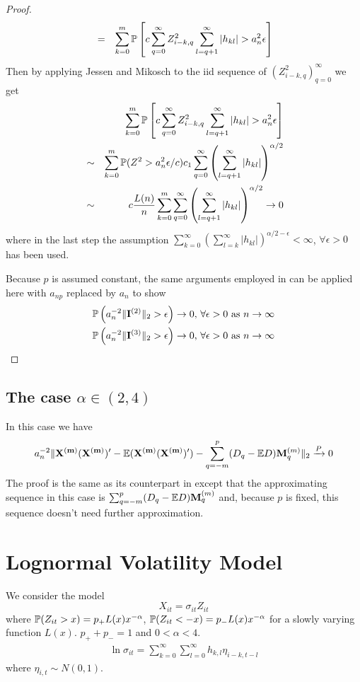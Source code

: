 \documentclass{article}
\begin{document}
\begin{proof}
\begin{eqnarray*}
    &=& \sum_{k=0}^m \mathbb{P}\left[c \sum_{q=0}^{\infty} Z_{i-k, q}^2
      \sum_{l=q+1}^\infty |h_{kl}| > a_n^2 \epsilon \right] \\
  \end{eqnarray*}
  Then by applying Jessen and Mikosch \cite{JessenMikosch2006} to the
  iid sequence of $(Z_{i-k, q}^2)_{q=0}^{\infty}$ we get
  \begin{eqnarray*}
    && \sum_{k=0}^m \mathbb{P}\left[c \sum_{q=0}^{\infty} Z_{i-k, q}^2
      \sum_{l=q+1}^\infty |h_{kl}| > a_n^2 \epsilon \right] \\
    &\sim& \sum_{k=0}^m \mathbb{P}(Z^2 > a_n^2 \epsilon/c) c_1
    \sum_{q=0}^{\infty} \left( \sum_{l=q+1}^\infty |h_{kl}|
    \right)^{\alpha/2} \\
    &\sim& c {L(n) \over n} \sum_{k=0}^m \sum_{q=0}^{\infty} \left(
      \sum_{l=q+1}^\infty |h_{kl}| \right)^{\alpha/2} \to 0
  \end{eqnarray*}
  where in the last step the assumption $\sum_{k=0}^{\infty}
  \left(\sum_{l=k}^{\infty} |h_{kl}|\right)^{\alpha/2-\epsilon} <
  \infty$, $\forall \epsilon > 0$ has been used.

  Because $p$ is assumed constant, the same arguments employed in
  \cite{Mikosch2014} can be applied here with $a_{np}$ replaced by
  $a_n$ to show
  \begin{eqnarray*}
    & \mathbb{P}\left(
      a_n^{-2} \|\mathbf{I}^{(2)}\|_2 > \epsilon
    \right) \to 0 \text{, } \forall \epsilon > 0 \text{ as } n \to
    \infty \\
    & \mathbb{P}\left(
      a_n^{-2} \|\mathbf{I}^{(3)}\|_2 > \epsilon
    \right) \to 0 \text{, } \forall \epsilon > 0 \text{ as } n \to \infty
  \end{eqnarray*}
\end{proof}

\subsection[alpha in (2,4)]{The case $\alpha \in (2,4)$}
In this case we have
\[
a_n^{-2} \|\mathbf{X^{(m)} (X^{(m)})'} - \mathbb{E}(\mathbf{X^{(m)} (X^{(m)})'}) -
\sum_{q=-m}^p (D_q - \mathbb{E} D) \mathbf{M}_q^{(m)}\|_2
\xrightarrow{P} 0
\]
The proof is the same as its counterpart in \cite{Mikosch2014} except
that the approximating sequence in this case is $\sum_{q=-m}^p (D_q -
\mathbb{E} D) \mathbf{M}_q^{(m)}$ and, because $p$ is fixed, this sequence doesn't
need further approximation.

\section{Lognormal Volatility Model}
We consider the model
\[
X_{it} = \sigma_{it} Z_{it}
\]
where $\mathbb{P}(Z_{it} > x) = p_+ L(x) x^{-\alpha}$, $\mathbb{P}(Z_{it} < -x) =
p_- L(x) x^{-\alpha}$ for a slowly varying function $L(x)$. $p_+ +
p_- = 1$ and $0 < \alpha < 4$.
\begin{eqnarray*}
  \ln \sigma_{it} = \sum_{k=0}^\infty \sum_{l=0}^\infty h_{k,l}
  \eta_{i-k,t-l}
\end{eqnarray*}
where $\eta_{i,t} \sim N(0, 1)$.



\end{document}
